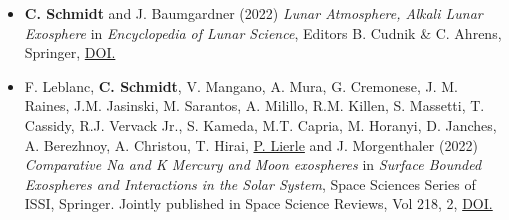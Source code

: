 \documentclass[12pt]{report}
\begin{document}
\begin{itemize} \itemsep -2pt %
  \item \textbf{C. Schmidt} and J. Baumgardner (2022) \textit{Lunar Atmosphere, Alkali Lunar Exosphere} in \textit{Encyclopedia of Lunar Science}, Editors B. Cudnik \& C. Ahrens, Springer, \href{https://doi.org/10.1007/978-3-319-05546-6_230-1}{DOI.}
  \item F. Leblanc, \textbf{C. Schmidt}, V. Mangano, A. Mura, G. Cremonese, J. M. Raines, J.M. Jasinski, M. Sarantos, A. Milillo, R.M. Killen, S. Massetti, T. Cassidy, R.J. Vervack Jr., S. Kameda, M.T. Capria, M. Horanyi, D. Janches, A. Berezhnoy, A. Christou, T. Hirai, \underline{P. Lierle} and J. Morgenthaler (2022) \textit{Comparative Na and K Mercury and Moon exospheres} in \textit{Surface Bounded Exospheres and Interactions in the Solar System}, Space Sciences Series of ISSI, Springer. Jointly published in Space Science Reviews, Vol 218, 2, \href{https://doi.org/10.1007/s11214-022-00871-w}{DOI.}
 \end{itemize}
\end{document}
